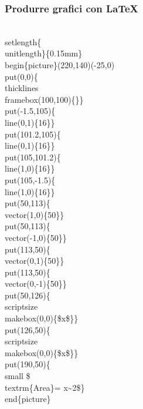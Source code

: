 \documentclass[svgnames,%
	ucs,%
	pdftex]{guitbeamer}
\begin{document}
\begin{frame}
  \frametitle{Produrre grafici con \LaTeX}
	\begin{LaTeXcode}
		\small
		\\setlength\{\\unitlength\}\{0.15mm\}\n
		\\begin\{picture\}(220,140)(-25,0)\n
		\hspace*{5ex}\\put(0,0)\{\\thicklines \\framebox(100,100)\{\}\}\n
		\hspace*{5ex}\\put(-1.5,105)\{\\line(0,1)\{16\}\}\n
		\hspace*{5ex}\\put(101.2,105)\{\\line(0,1)\{16\}\}\n
		\hspace*{5ex}\\put(105,101.2)\{\\line(1,0)\{16\}\}\n
		\hspace*{5ex}\\put(105,-1.5)\{\\line(1,0)\{16\}\}\n
		\hspace*{5ex}\\put(50,113)\{\\vector(1,0)\{50\}\}\n
		\hspace*{5ex}\\put(50,113)\{\\vector(-1,0)\{50\}\}\n
		\hspace*{5ex}\\put(113,50)\{\\vector(0,1)\{50\}\}\n
		\hspace*{5ex}\\put(113,50)\{\\vector(0,-1)\{50\}\}\n
		\hspace*{5ex}\\put(50,126)\{\\scriptsize \\makebox(0,0)\{\$x\$\}\}\n
		\hspace*{5ex}\\put(126,50)\{\\scriptsize \\makebox(0,0)\{\$x\$\}\}\n
		\hspace*{5ex}\\put(190,50)\{\\small \$\\textrm\{Area\}= x\textasciitilde2\$\}\n
		\\end\{picture\}
	\end{LaTeXcode}
\end{frame}
\end{document}
